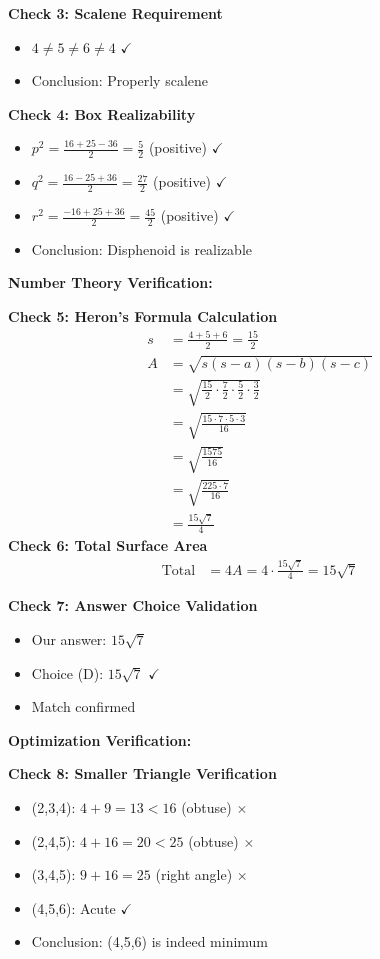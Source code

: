 \documentclass[12pt]{article}
\begin{document}
\begin{verificationbox}
\textbf{Check 3: Scalene Requirement}
\begin{itemize}
    \item $4 \neq 5 \neq 6 \neq 4$ $\checkmark$
    \item Conclusion: Properly scalene
\end{itemize}

\textbf{Check 4: Box Realizability}
\begin{itemize}
    \item $p^2 = \frac{16+25-36}{2} = \frac{5}{2}$ (positive) $\checkmark$
    \item $q^2 = \frac{16-25+36}{2} = \frac{27}{2}$ (positive) $\checkmark$
    \item $r^2 = \frac{-16+25+36}{2} = \frac{45}{2}$ (positive) $\checkmark$
    \item Conclusion: Disphenoid is realizable
\end{itemize}

\textbf{Number Theory Verification:}

\textbf{Check 5: Heron's Formula Calculation}
\begin{align*}
s &= \frac{4+5+6}{2} = \frac{15}{2} \\
A &= \sqrt{s(s-a)(s-b)(s-c)} \\
&= \sqrt{\frac{15}{2} \cdot \frac{7}{2} \cdot \frac{5}{2} \cdot \frac{3}{2}} \\
&= \sqrt{\frac{15 \cdot 7 \cdot 5 \cdot 3}{16}} \\
&= \sqrt{\frac{1575}{16}} \\
&= \sqrt{\frac{225 \cdot 7}{16}} \\
&= \frac{15\sqrt{7}}{4}
\end{align*}
\textbf{Check 6: Total Surface Area}
\begin{align*}
\text{Total} &= 4A = 4 \cdot \frac{15\sqrt{7}}{4} = 15\sqrt{7}
\end{align*}

\textbf{Check 7: Answer Choice Validation}
\begin{itemize}
    \item Our answer: $15\sqrt{7}$
    \item Choice (D): $15\sqrt{7}$ $\checkmark$
    \item Match confirmed
\end{itemize}

\textbf{Optimization Verification:}

\textbf{Check 8: Smaller Triangle Verification}
\begin{itemize}
    \item (2,3,4): $4 + 9 = 13 < 16$ (obtuse) $\times$
    \item (2,4,5): $4 + 16 = 20 < 25$ (obtuse) $\times$
    \item (3,4,5): $9 + 16 = 25$ (right angle) $\times$
    \item (4,5,6): Acute $\checkmark$
    \item Conclusion: (4,5,6) is indeed minimum
\end{itemize}


\end{verificationbox}
\end{document}
